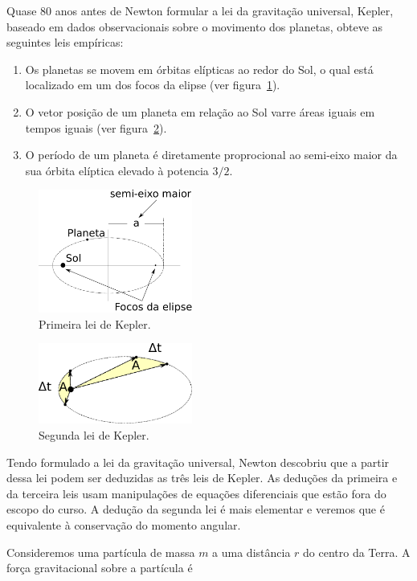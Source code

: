 \documentclass[papersize=a4,DIV=calc,twocolumn=on]{scrartcl}
\theoremstyle{definition}
\begin{document}
Quase 80 anos antes de Newton formular a lei da gravitação universal,
Kepler, baseado em dados observacionais sobre o movimento dos
planetas, obteve as seguintes leis empíricas:
\begin{enumerate}
\item Os planetas se movem em órbitas elípticas ao redor do Sol, o
  qual está localizado em um dos focos da elipse (ver
  figura~\ref{fig:orbitaeliptica}).
\item O vetor posição de um planeta em relação ao Sol varre áreas
  iguais em tempos iguais (ver figura~\ref{fig:leikepler2}).
\item O período de um planeta é diretamente proprocional ao semi-eixo
  maior da sua órbita elíptica elevado à potencia $3/2$.
\end{enumerate}
\begin{figure}[ht]
  \centering
  \includegraphics[width=0.45\textwidth,keepaspectratio]{orbitaeliptica.pdf}
  \caption{Primeira lei de Kepler.}
  \label{fig:orbitaeliptica}
\end{figure}
\begin{figure}[ht]
  \centering
  \includegraphics[width=0.45\textwidth,keepaspectratio]{leikepler2.pdf}
  \caption{Segunda lei de Kepler.}
  \label{fig:leikepler2}
\end{figure}

Tendo formulado a lei da gravitação universal, Newton descobriu que a
partir dessa lei podem ser deduzidas as três leis de Kepler. As
deduções da primeira e da terceira leis usam manipulações de equações
diferenciais que estão fora do escopo do curso. A dedução da segunda
lei é mais elementar e veremos que é equivalente à conservação do
momento angular.

Consideremos uma partícula de massa $m$ a uma distância $r$ do centro da Terra. A força gravitacional sobre a partícula é
\end{document}
